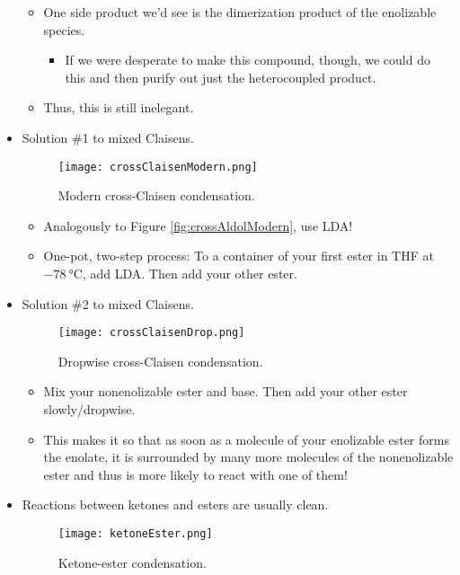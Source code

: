 \documentclass[../notes.tex]{subfiles}
\begin{document}
\begin{itemize}
\begin{itemize}
        \item One side product we'd see is the dimerization product of the enolizable species.
        \begin{itemize}
            \item If we were desperate to make this compound, though, we could do this and then purify out just the heterocoupled product.
        \end{itemize}
        \item Thus, this is still inelegant.
    \end{itemize}
    \item Solution \#1 to mixed Claisens.
    \begin{figure}[h!]
        \centering
        \texttt{[image: crossClaisenModern.png]}
        \caption{Modern cross-Claisen condensation.}
        \label{fig:crossClaisenModern}
    \end{figure}
    \begin{itemize}
        \item Analogously to Figure \ref{fig:crossAldolModern}, use LDA!
        \item One-pot, two-step process: To a container of your first ester in THF at $-\SI{78}{\celsius}$, add LDA. Then add your other ester.
    \end{itemize}
    \item Solution \#2 to mixed Claisens.
    \begin{figure}[h!]
        \centering
        \texttt{[image: crossClaisenDrop.png]}
        \caption{Dropwise cross-Claisen condensation.}
        \label{fig:crossClaisenDrop}
    \end{figure}
    \begin{itemize}
        \item Mix your nonenolizable ester and base. Then add your other ester slowly/dropwise.
        \item This makes it so that as soon as a molecule of your enolizable ester forms the enolate, it is surrounded by many more molecules of the nonenolizable ester and thus is more likely to react with one of them!
    \end{itemize}
    \item Reactions between ketones and esters are usually clean.
    \begin{figure}[h!]
        \centering
        \texttt{[image: ketoneEster.png]}
        \caption{Ketone-ester condensation.}
        \label{fig:ketoneEster}

\end{figure}
\end{itemize}
\end{document}

